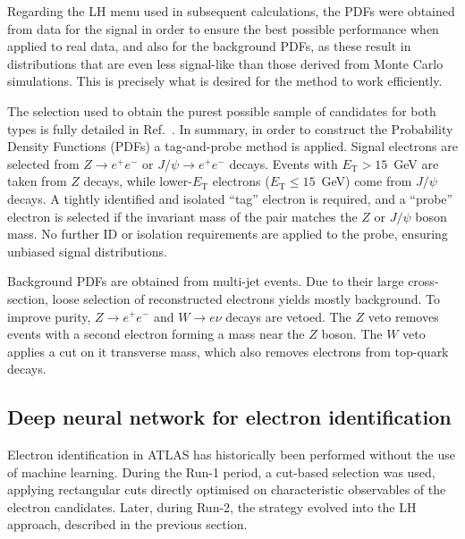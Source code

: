 Regarding the LH menu used in subsequent calculations, the PDFs were obtained from data for the signal in order to ensure the best possible performance when applied to real data, and also for the background PDFs, as these result in distributions that are even less signal-like than those derived from Monte Carlo simulations. This is precisely what is desired for the method to work efficiently.

The selection used to obtain the purest possible sample of candidates for both types is fully detailed in Ref.~\cite{lucas_thesis}. In summary, in order to construct the Probability Density Functions (PDFs) a tag-and-probe method is applied. Signal electrons are selected from $Z \rightarrow e^{+}e^{-}$ or $J/\psi \rightarrow e^{+}e^{-}$ decays. Events with $E_{\text{T}} > 15$~GeV are taken from $Z$ decays, while lower-$E_{\text{T}}$ electrons ($E_{\text{T}} \leq 15$~GeV) come from $J/\psi$ decays. A tightly identified and isolated “tag” electron is required, and a “probe” electron is selected if the invariant mass of the pair matches the $Z$ or $J/\psi$ boson mass. No further ID or isolation requirements are applied to the probe, ensuring unbiased signal distributions.

Background PDFs are obtained from multi-jet events. Due to their large cross-section, loose selection of reconstructed electrons yields mostly background. To improve purity, $Z \rightarrow e^{+}e^{-}$ and $W \rightarrow e\nu$ decays are vetoed. The $Z$ veto removes events with a second electron forming a mass near the $Z$ boson. The $W$ veto applies a cut on it transverse mass, which also removes electrons from top-quark decays.


\subsection{Deep neural network for electron identification}
\label{subsec:dnn_id}

Electron identification in ATLAS has historically been performed without the use of machine learning. During the Run-1 period, a cut-based selection was used, applying rectangular cuts directly optimised on characteristic observables of the electron candidates. Later, during Run-2, the strategy evolved into the LH approach, described in the previous section.

